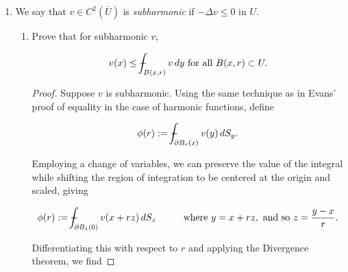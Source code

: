 \documentclass[11pt,oneside,english]{amsart}
\theoremstyle{definition}
\newcommand{\pspace}{\hspace{10mm}}
\def\Xint#1{\mathchoice
{\XXint\displaystyle\textstyle{#1}}%
{\XXint\textstyle\scriptstyle{#1}}%
{\XXint\scriptstyle\scriptscriptstyle{#1}}%
{\XXint\scriptscriptstyle\scriptscriptstyle{#1}}%
\!\int}
\def\XXint#1#2#3{{\setbox0=\hbox{$#1{#2#3}{\int}$ }
\vcenter{\hbox{$#2#3$ }}\kern-.6\wd0}}
\def\dashint{\Xint-}
\begin{document}
\begin{enumerate}
\begin{proof}
Thus, $v\in C^2(U)$, whence $\Delta v=0$ so $v$ is harmonic in $U$.
%
%

\end{proof}

\pagebreak

\setcounter{enumi}{3}
\item We say that $v\in C^2\left(\overline{U}\right)$ is \textit{subharmonic} if $-\Delta v\leq 0\text{ in }U$.

\begin{enumerate}
\item Prove that for subharmonic $v$, 

\[
v(x)\leq \dashint_{B(x,r)} v\,dy\text{ for all }B(x,r)\subset U. 
\]

\begin{proof}
Suppose $v$ is subharmonic. Using the same technique as in Evans' proof of equality in the case of harmonic functions, define

\[
\phi(r):=\dashint_{\partial B_r(x)}v(y)\,dS_y.
\]


Employing a change of variables, we can preserve the value of the integral while shifting the region of integration to be centered at the origin and scaled, giving

\[
\phi(r):=\dashint_{\partial B_1(0)}v(x+rz)\,dS_z\pspace\text{where }y=x+rz,\text{ and so }z=\frac{y-x}{r}.
\]

\vspace{-0.5cm}
Differentiating this with respect to $r$ and applying the Divergence theorem, we find


\end{proof}
\end{enumerate}
\end{enumerate}
\end{document}
